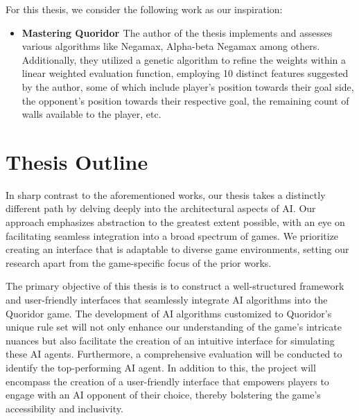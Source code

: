 For this thesis, we consider the following work as our inspiration:

\begin{itemize}
    \item \textbf{Mastering Quoridor \citep{Glendenning2002MasteringQ}}
    The author of the thesis implements and assesses various algorithms like Negamax, Alpha-beta Negamax among others. Additionally, they utilized a genetic algorithm to refine the weights within a linear weighted evaluation function, employing 10 distinct features suggested by the author, some of which include player's position towards their goal side, the opponent's position towards their respective goal, the remaining count of walls available to the player, etc.
\end{itemize}

\section{Thesis Outline}

In sharp contrast to the aforementioned works, our thesis takes a distinctly different path by delving deeply into the architectural aspects of AI. Our approach emphasizes abstraction to the greatest extent possible, with an eye on facilitating seamless integration into a broad spectrum of games. We prioritize creating an interface that is adaptable to diverse game environments, setting our research apart from the game-specific focus of the prior works.

The primary objective of this thesis is to construct a well-structured framework and user-friendly interfaces that seamlessly integrate AI algorithms into the Quoridor game. The development of AI algorithms customized to Quoridor's unique rule set will not only enhance our understanding of the game's intricate nuances but also facilitate the creation of an intuitive interface for simulating these AI agents. Furthermore, a comprehensive evaluation will be conducted to identify the top-performing AI agent. In addition to this, the project will encompass the creation of a user-friendly interface that empowers players to engage with an AI opponent of their choice, thereby bolstering the game's accessibility and inclusivity.




